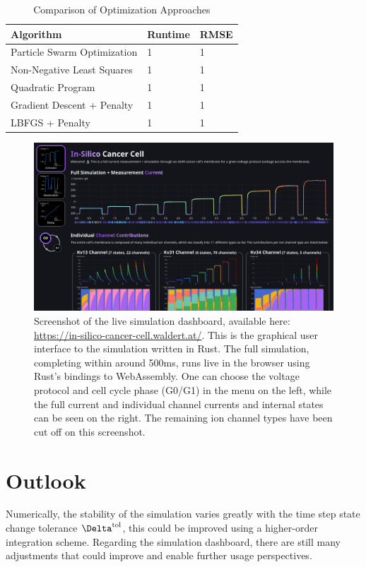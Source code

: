 \begin{table}
  \caption{Comparison of Optimization Approaches}
  \begin{tabular}{lll}
    \textbf{Algorithm}                          & \textbf{Runtime} & \textbf{RMSE} \\
    \midrule
    Particle Swarm Optimization                 & 1                & 1             \\
    Non-Negative Least Squares \cite{1997-nnls} & 1                & 1             \\
    Quadratic Program                           & 1                & 1             \\
    Gradient Descent + Penalty                  & 1                & 1             \\
    LBFGS + Penalty                             & 1                & 1             \\
  \end{tabular}
  \label{table:optimization-comparison}
\end{table}

\begin{figure}[ht]
  \includegraphics[width=\textwidth]{../figures/above-the-fold-screenshot.png}
  \caption{Screenshot of the live simulation dashboard, available here: \url{https://in-silico-cancer-cell.waldert.at/}. This is the graphical user interface to the simulation written in Rust. The full simulation, completing within around 500ms, runs live in the browser using Rust's bindings to WebAssembly. One can choose the voltage protocol and cell cycle phase (G0/G1) in the menu on the left, while the full current and individual channel currents and internal states can be seen on the right. The remaining ion channel types have been cut off on this screenshot.}
  \label{figure:screenshot}
\end{figure}

\section{Outlook}
Numerically, the stability of the simulation varies greatly with the time step state change tolerance $\Delta^{\rm tol}$, this could be improved using a higher-order integration scheme.
Regarding the simulation dashboard, there are still many adjustments that could improve and enable further usage perspectives.
